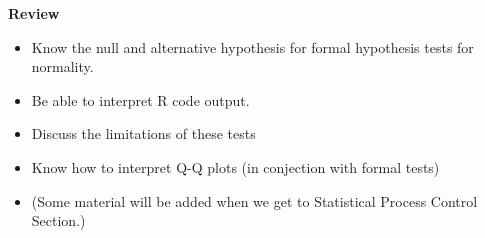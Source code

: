 \documentclass{beamer}
\begin{document}
\begin{frame}
	\Large
\textbf{Review}
\begin{itemize}
	\item Know the null and alternative hypothesis for formal hypothesis tests for normality.
	\item Be able to interpret R code output.
	\item Discuss the limitations of these tests
	\item Know how to interpret Q-Q plots (in conjection with formal tests)
 \item (Some material will be added when we get to Statistical Process Control Section.)
\end{itemize}
\end{frame}
\end{document}
